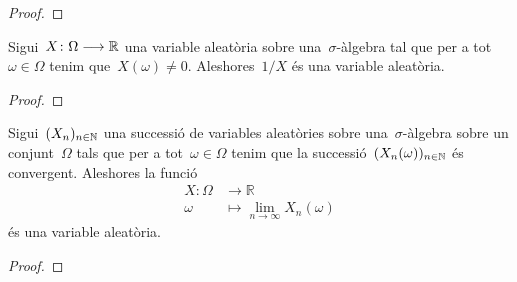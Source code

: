 \documentclass[../../main.tex]{subfiles}
\begin{document}
    \begin{proof}
    \end{proof}
    \begin{proposition}
        \label{prop:les variables aleatòries formen un cos}
        Sigui~\(X\colon\Omega\longrightarrow\mathbb{R}\) una variable aleatòria sobre una~\(\sigma\)-àlgebra tal que per a tot~\(\omega\in\Omega\) tenim que~\(X(\omega)\neq0\).
        Aleshores~\(1/X\) és una variable aleatòria.
    \end{proposition}
    \begin{proof}
    \end{proof}
    \begin{proposition}
        \label{prop:el cos de variables aleatòries és tancat}
        Sigui~\((X_{n})_{n\in\mathbb{N}}\) una successió de variables aleatòries sobre una~\(\sigma\)-àlgebra sobre un conjunt~\(\Omega\) tals que per a tot~\(\omega\in\Omega\) tenim que la successió~\((X_{n}(\omega))_{n\in\mathbb{N}}\) és convergent.
        Aleshores la funció
        \begin{align*}
            X\colon\Omega&\longrightarrow\mathbb{R} \\
            \omega&\longmapsto\lim_{n\to\infty}X_{n}(\omega)
        \end{align*}
        és una variable aleatòria.
    \end{proposition}
    \begin{proof}
    \end{proof}
\end{document}
